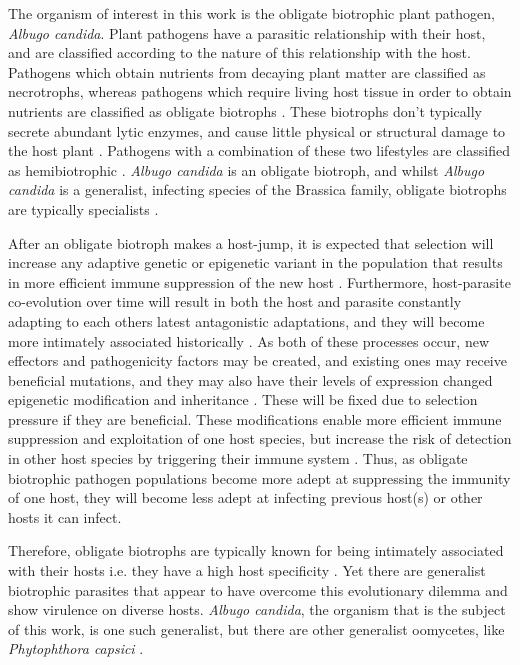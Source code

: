 The organism of interest in this work is the obligate biotrophic plant pathogen, \textit{Albugo candida}. Plant pathogens have a parasitic relationship with their host, and are classified according to the nature of this relationship with the host. Pathogens which obtain nutrients from decaying plant matter are classified as necrotrophs, whereas pathogens which require living host tissue in order to obtain nutrients are classified as obligate biotrophs \parencite{Kemen2012}⁠. These biotrophs don't typically secrete abundant lytic enzymes, and cause little physical or structural damage to the host plant \parencite{Kemen2012}⁠. Pathogens with a combination of these two lifestyles are classified as hemibiotrophic \parencite{Kemen2012,Lamour2012PathogenCapsici}. \textit{Albugo candida} is an obligate biotroph, and whilst \textit{Albugo candida} is a generalist, infecting species of the Brassica family, obligate biotrophs are typically specialists \parencite{McMullan2015a}⁠.

After an obligate biotroph makes a host-jump, it is expected that selection will increase any adaptive genetic or epigenetic variant in the population that results in more efficient immune suppression of the new host \parencite{Dong2014,Kemen2012,Poulin2008,Raffaele2010,Thines2014}. Furthermore, host-parasite co-evolution over time will result in both the host and parasite constantly adapting to each others latest antagonistic adaptations, and they will become more intimately associated historically \parencite{Morgan2007,Raffaele2012,Thines2014}. As both of these processes occur, new effectors and pathogenicity factors may be created, and existing ones may receive beneficial mutations, and they may also have their levels of expression changed epigenetic modification and inheritance \parencite{Dong2014,Gijzen2014EpigeneticPathogens,Raffaele2012,Raffaele2010,Win2012}. These will be fixed due to selection pressure if they are beneficial. These modifications enable more efficient immune suppression and exploitation of one host species, but increase the risk of detection in other host species by triggering their immune system \parencite{Martin2012EffectorsInteractions}. Thus, as obligate biotrophic pathogen populations become more adept at suppressing the immunity of one host, they will become less adept at infecting previous host(s) or other hosts it can infect.

Therefore, obligate biotrophs are typically known for being intimately associated with their hosts i.e. they have a high host specificity \parencite{Thines2014}. Yet there are generalist biotrophic parasites that appear to have overcome this evolutionary dilemma and show virulence on diverse hosts. \textit{Albugo candida}, the organism that is the subject of this work, is one such generalist, but there are other generalist oomycetes, like \textit{Phytophthora capsici} \parencite{Lamour2012PathogenCapsici}⁠.

